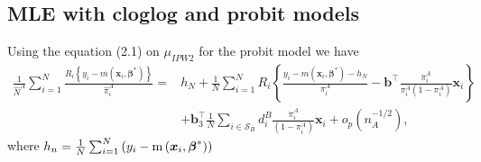 \documentclass[
  letterpaper,
  DIV=11,
  numbers=noendperiod]{scrreprt}
\begin{document}
\hypertarget{mle-with-cloglog-and-probit-models}{%
\subsection{MLE with cloglog and probit
models}\label{mle-with-cloglog-and-probit-models}}

Using the equation (2.1) on \(\mu_{IPW2}\) for the probit model we have
\[
\begin{equation}
\begin{aligned}
\frac{1}{\hat{N}^A} \sum_{i=1}^N \frac{R_i\left\{y_i-m\left(\boldsymbol{x}_i, \boldsymbol{\beta}^*\right)\right\}}{\hat{\pi}_i^A} = & h_N+\frac{1}{N} \sum_{i=1}^N R_i\left\{\frac{y_i-m\left(\boldsymbol{x}_i, \boldsymbol{\beta}^*\right)-h_N}{\pi_i^A}-\mathbf{b}^{\top} \frac{\dot{\pi}_i^A}{\pi_i^A \left(1 - \pi_i^A\right)} \boldsymbol{x}_i\right\} \\
& +\mathbf{b}_3^{\top} \frac{1}{N} \sum_{i \in \mathcal{S}_B} d_i^B \frac{\dot{\pi}_i^A}{\left(1 - \pi_i^A\right)} \boldsymbol{x}_i+o_p\left(n_A^{-1 / 2}\right),
\end{aligned}
\end{equation}
\] where
\(h_n = \frac{1}{N} \sum_{i=1}^N \left(y_i - \operatorname{m}\left(\boldsymbol{x}_i,\boldsymbol{\beta}^*\right)\right)\)
\end{document}
